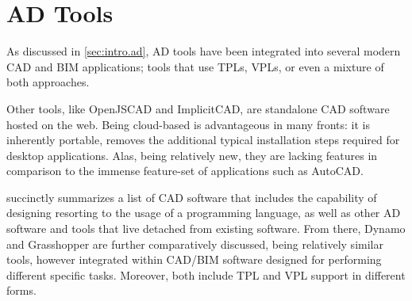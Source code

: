 \section{\acl{AD} Tools}
\label{sec:related.ad}

As discussed in \cref{sec:intro.ad}, \ac{AD} tools have been integrated into
several modern \ac{CAD} and \ac{BIM} applications; tools that use \acp{TPL},
\acp{VPL}, or even a mixture of both approaches.

Other tools, like OpenJSCAD and ImplicitCAD, are standalone \ac{CAD} software
hosted on the web.  Being cloud-based is advantageous in many fronts: it is
inherently portable, removes the additional typical installation steps required
for desktop applications.  Alas, being relatively new, they are lacking features
in comparison to the immense feature-set of applications such as AutoCAD.

 succinctly summarizes a list of \ac{CAD} software
that includes the capability of designing resorting to the usage of a
programming language, as well as other \ac{AD} software and tools that live
detached from existing software.  From there, Dynamo and Grasshopper are further
comparatively discussed, being relatively similar tools, however integrated
within \ac{CAD}/\ac{BIM} software designed for performing different specific
tasks.  Moreover, both include \ac{TPL} and \ac{VPL} support in different forms.

